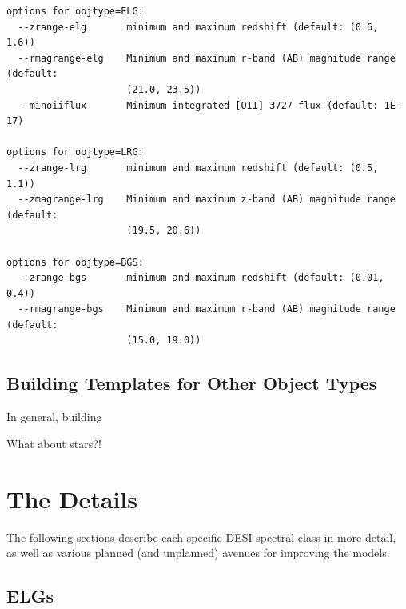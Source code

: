 \documentclass[11pt]{article}
\begin{document}
\begin{verbatim}
options for objtype=ELG:
  --zrange-elg       minimum and maximum redshift (default: (0.6, 1.6))
  --rmagrange-elg    Minimum and maximum r-band (AB) magnitude range (default:
                     (21.0, 23.5))
  --minoiiflux       Minimum integrated [OII] 3727 flux (default: 1E-17)

options for objtype=LRG:
  --zrange-lrg       minimum and maximum redshift (default: (0.5, 1.1))
  --zmagrange-lrg    Minimum and maximum z-band (AB) magnitude range (default:
                     (19.5, 20.6))

options for objtype=BGS:
  --zrange-bgs       minimum and maximum redshift (default: (0.01, 0.4))
  --rmagrange-bgs    Minimum and maximum r-band (AB) magnitude range (default:
                     (15.0, 19.0))

\end{verbatim}


\subsection{Building Templates for Other Object Types}

In general, building 



What about stars?!

\section{The Details}

The following sections describe each specific DESI spectral class in more
detail, as well as various planned (and unplanned) avenues for improving the
models.


\subsection{ELGs}
\end{document}
